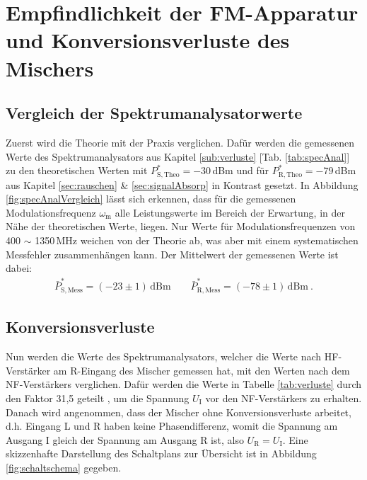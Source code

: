 
\section{Empfindlichkeit der FM-Apparatur und Konversionsverluste des Mischers}
\label{sec:verlusteAuswertung}

\subsection{Vergleich der Spektrumanalysatorwerte}
\label{sub:specAnalVergleich}

Zuerst wird die Theorie mit der Praxis verglichen. Dafür werden die gemessenen Werte des Spektrumanalysators aus Kapitel \ref{sub:verluste} [Tab. \ref{tab:specAnal}] zu den theoretischen Werten mit $P^*_\mathrm{S,Theo} = -30$\,dBm und für $P^*_\mathrm{R,Theo}= -79$\,dBm aus Kapitel \ref{sec:rauschen} \& \ref{sec:signalAbsorp} in Kontrast gesetzt. In Abbildung \ref{fig:specAnalVergleich} lässt sich erkennen, dass für die gemessenen Modulationsfrequenz $\omega_\mathrm{m}$ alle Leistungswerte im Bereich der Erwartung, in der Nähe der theoretischen Werte, liegen. Nur Werte für Modulationsfrequenzen von 400 $\sim$ 1350\,MHz weichen von der Theorie ab, was aber mit einem systematischen Messfehler zusammenhängen kann. Der Mittelwert der gemessenen Werte ist dabei:
\begin{gather}
    \boxed{\bar{P}^*_\mathrm{S,Mess} = (-23 \pm 1)\,\mathrm{dBm}} \qquad \boxed{\bar{P}^*_\mathrm{R,Mess} = (-78 \pm 1)\,\mathrm{dBm}}~.
\end{gather}

\subsection{Konversionsverluste}
\label{sub:konversionsverluste}

Nun werden die Werte des Spektrumanalysators, welcher die Werte nach HF-Verstärker am R-Eingang des Mischer gemessen hat, mit den Werten nach dem NF-Verstärkers verglichen. Dafür werden die Werte in Tabelle \ref{tab:verluste} durch den Faktor 31,5 geteilt \cite{anleitung}, um die Spannung $U_\mathrm{I}$ vor den NF-Verstärkers zu erhalten. Danach wird angenommen, dass der Mischer ohne Konversionsverluste arbeitet, d.h. Eingang L und R haben keine Phasendifferenz, womit die Spannung am Ausgang I gleich der Spannung am Ausgang R ist, also $U_\mathrm{R} = U_\mathrm{I}$. Eine skizzenhafte Darstellung des Schaltplans zur Übersicht ist in Abbildung \ref{fig:schaltschema} gegeben.

